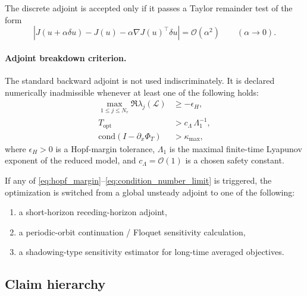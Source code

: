 The discrete adjoint is accepted only if it passes a Taylor remainder test of the form
\begin{equation}
\left|
J(u+\alpha \delta u)-J(u)-\alpha \nabla J(u)^\top \delta u
\right|
=
\mathcal{O}(\alpha^2)
\qquad
(\alpha\to 0).
\label{eq:taylor_test}
\end{equation}

\paragraph{Adjoint breakdown criterion.}
The standard backward adjoint is not used indiscriminately.
It is declared numerically inadmissible whenever at least one of the following holds:
\begin{align}
\max_{1\le j\le N_r}\Re\lambda_j(\mathcal{L}) &\ge -\epsilon_H,
\label{eq:hopf_margin}
\\
T_{\mathrm{opt}} &> c_\Lambda\,\Lambda_1^{-1},
\label{eq:lyapunov_limit}
\\
\mathrm{cond}\!\left(I-\partial_x\Phi_T\right) &> \kappa_{\max},
\label{eq:condition_number_limit}
\end{align}
where $\epsilon_H>0$ is a Hopf-margin tolerance,
$\Lambda_1$ is the maximal finite-time Lyapunov exponent of the reduced model,
and $c_\Lambda=\mathcal{O}(1)$ is a chosen safety constant.

If any of \eqref{eq:hopf_margin}--\eqref{eq:condition_number_limit} is triggered,
the optimization is switched from a global unsteady adjoint to one of the following:
\begin{enumerate}
\item a short-horizon receding-horizon adjoint,
\item a periodic-orbit continuation / Floquet sensitivity calculation,
\item a shadowing-type sensitivity estimator for long-time averaged objectives.
\end{enumerate}

\subsection{Claim hierarchy}
\label{subsec:claim_hierarchy_rhps}

